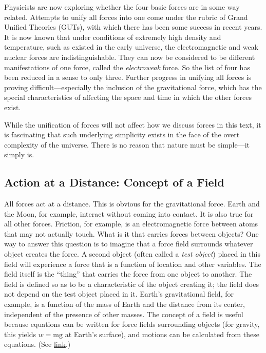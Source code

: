 \documentclass[
]{book}
\begin{document}
Physicists are now exploring whether the four basic forces are in some
way related. Attempts to unify all forces into one come under the rubric
of Grand Unified Theories (GUTs), with which there has been some success
in recent years. It is now known that under conditions of extremely high
density and temperature, such as existed in the early universe, the
electromagnetic and weak nuclear forces are indistinguishable. They can
now be considered to be different manifestations of one force, called
the \emph{electroweak} force. So the list of four has been reduced in a sense
to only three. Further progress in unifying all forces is proving
difficult---especially the inclusion of the gravitational force, which
has the special characteristics of affecting the space and time in which
the other forces exist.

While the unification of forces will not affect how we discuss forces in
this text, it is fascinating that such underlying simplicity exists in
the face of the overt complexity of the universe. There is no reason
that nature must be simple---it simply is.

\hypertarget{import-auto-id3077454}{}
\hypertarget{action-at-a-distance-concept-of-a-field}{%
\subsection{Action at a Distance: Concept of a Field}\label{action-at-a-distance-concept-of-a-field}}

All forces act at a distance. This is obvious for the gravitational
force. Earth and the Moon, for example, interact without coming into
contact. It is also true for all other forces. Friction, for example, is
an electromagnetic force between atoms that may not actually touch. What
is it that carries forces between objects? One way to answer this
question is to imagine that a \protect\hypertarget{import-auto-id3093199}{}{force field} surrounds whatever object creates the force. A second
object (often called a \emph{test object}) placed in this field will
experience a force that is a function of location and other variables.
The field itself is the ``thing'' that carries the force from one object
to another. The field is defined so as to be a characteristic of the
object creating it; the field does not depend on the test object placed
in it. Earth's gravitational field, for example, is a function of the
mass of Earth and the distance from its center, independent of the
presence of other masses. The concept of a field is useful because
equations can be written for force fields surrounding objects (for
gravity, this yields \({w = \text{mg}}{}\) at Earth's surface), and
motions can be calculated from these equations. (See
\protect\hyperlink{import-auto-id1577565}{link}.)
\end{document}
